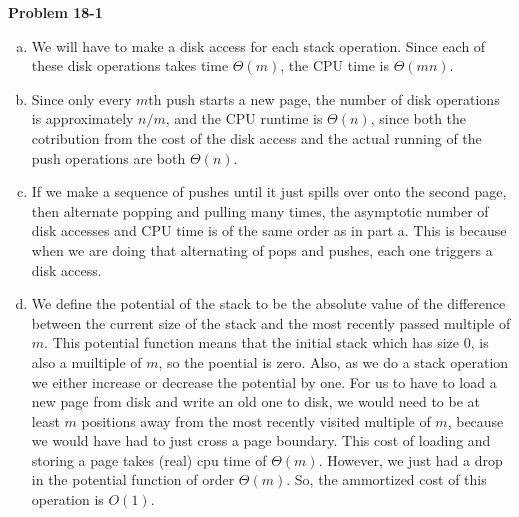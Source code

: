 \documentclass{article}
\begin{document}
\noindent\textbf{Problem 18-1}\\
\begin{enumerate}[a.]
\item
We will have to make a disk access for each stack operation. Since each of these disk operations takes time $\Theta(m)$, the CPU time is $\Theta(mn)$.

\item
Since only every $m$th push starts a new page, the number of disk operations is approximately $n/m$, and the CPU runtime is $\Theta(n)$, since both the cotribution from the cost of the disk access and the actual running of the push operations are both $\Theta(n)$.
\item
If we make a sequence of pushes until it just spills over onto the second page, then alternate popping and pulling many times, the asymptotic number of disk accesses and CPU time is of the same order as in part a. This is because when we are doing that alternating of pops and pushes, each one triggers a disk access.
\item
We define the potential of the stack to be the absolute value of the difference between the current size of the stack and the most recently passed multiple of $m$. This potential function means that the initial stack which has size 0, is also a muiltiple of $m$, so the poential is zero. Also, as we do a stack operation we either increase or decrease the potential by one. For us to have to load a new page from disk and write an old one to disk, we would need to be at least $m$ positions away from the most recently visited multiple of $m$, because we would have had to just cross a page boundary. This cost of loading and storing a page takes (real) cpu time of $\Theta(m)$. However, we just had a drop in the potential function of order $\Theta(m)$. So, the ammortized cost of this operation is $O(1)$.

\end{enumerate}
\end{document}
